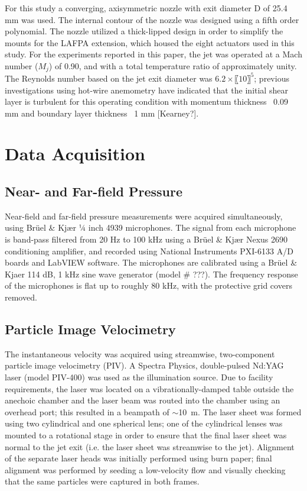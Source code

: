 For this study a converging, axisymmetric nozzle with exit diameter D of 25.4 mm was used. 
The internal contour of the nozzle was designed using a fifth order polynomial. 
The nozzle utilized a thick-lipped design in order to simplify the mounts for the LAFPA extension, which housed the eight actuators used in this study. 
For the experiments reported in this paper, the jet was operated at a Mach number ($M_j$) of 0.90, and with a total temperature ratio of approximately unity. 
The Reynolds number based on the jet exit diameter was $6.2\times〖10〗^5$; previous investigations using hot-wire anemometry have indicated that the initial shear layer is turbulent for this operating condition with momentum thickness ~0.09 mm and boundary layer thickness ~1 mm [Kearney?].

\section{Data Acquisition}
\subsection{Near- and Far-field Pressure}
Near-field and far-field pressure measurements were acquired simultaneously, using Brüel \& Kjær ¼ inch 4939 microphones. 
The signal from each microphone is band-pass filtered from 20 Hz to 100 kHz using a Brüel \& Kjær Nexus 2690 conditioning amplifier, and recorded using National Instruments PXI-6133 A/D boards and LabVIEW software. 
The microphones are calibrated using a Brüel \& Kjaer 114 dB, 1 kHz sine wave generator (model \# ???). 
The frequency response of the microphones is flat up to roughly 80 kHz, with the protective grid covers removed. 

\subsection{Particle Image Velocimetry}
The instantaneous velocity was acquired using streamwise, two-component particle image velocimetry (PIV). 
A Spectra Physics, double-pulsed Nd:YAG laser (model PIV-400) was used as the illumination source. 
Due to facility requirements, the laser was located on a vibrationally-damped table outside the anechoic chamber and the laser beam was routed into the chamber using an overhead port; this resulted in a beampath of $\sim$10~m. 
The laser sheet was formed using two cylindrical and one spherical lens; one of the cylindrical lenses was mounted to a rotational stage in order to ensure that the final laser sheet was normal to the jet exit (i.e. the laser sheet was streamwise to the jet).
Alignment of the separate laser heads was initially performed using burn paper; final alignment was performed by seeding a low-velocity flow and visually checking that the same particles were captured in both frames.

